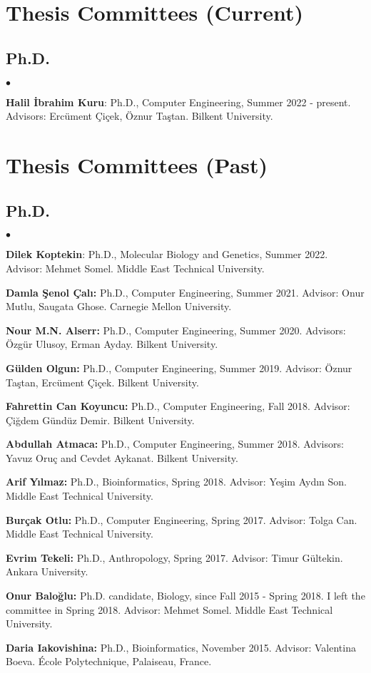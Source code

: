 \documentclass[margin,line]{res}
\newenvironment{list2}{
  \begin{list}{$\bullet$}{%
      \setlength{\itemsep}{0.1cm}
      \setlength{\parsep}{0in} \setlength{\parskip}{0in}
      \setlength{\topsep}{0in} \setlength{\partopsep}{0in} 
      \setlength{\leftmargin}{0.2in}}}{\end{list}}
\begin{document}
\begin{resume}
\section{\sc Thesis Committees (Current)}

\vspace*{-.4cm}
\subsection{\small \sc Ph.D.}
\begin{list2}
\item
{\bf Halil İbrahim Kuru}: Ph.D., Computer Engineering, Summer 2022 - present.
  Advisors: Ercüment Çiçek, Öznur Taştan.
  Bilkent University.
\end{list2}

\section{\sc Thesis Committees (Past)}

\vspace*{-.4cm}
\subsection{\small \sc Ph.D.}
\begin{list2}
\item
{\bf Dilek Koptekin}: Ph.D., Molecular Biology and Genetics, Summer 2022.
Advisor: Mehmet Somel. Middle East Technical University.
\item 
{\bf Damla Şenol Çalı:} Ph.D., Computer Engineering, Summer 2021. Advisor: Onur Mutlu, Saugata Ghose. Carnegie Mellon University.
\item 
{\bf  Nour M.N. Alserr:} Ph.D., Computer Engineering, Summer 2020.
  Advisors: Özgür Ulusoy, Erman Ayday.
  Bilkent University.
\item
  {\bf Gülden Olgun:} Ph.D., Computer Engineering, Summer 2019.
  Advisor: Öznur Taştan, Ercüment Çiçek.
  Bilkent University.
\item
  {\bf Fahrettin Can Koyuncu:} Ph.D., Computer Engineering, Fall 2018.
  Advisor: Çiğdem Gündüz Demir.
  Bilkent University.
\item
  {\bf Abdullah Atmaca:} Ph.D., Computer Engineering, Summer 2018.
  Advisors: Yavuz Oruç and Cevdet Aykanat.
  Bilkent University.
\item
  {\bf Arif Yılmaz:} Ph.D., Bioinformatics, Spring 2018.
  Advisor: Yeşim Aydın Son.
  Middle East Technical University.
\item 
  {\bf Burçak Otlu:} Ph.D., Computer Engineering, Spring 2017.
  Advisor: Tolga Can.
  Middle East Technical University. 
\item 
  {\bf Evrim Tekeli:} Ph.D., Anthropology,  Spring 2017.
  Advisor: Timur G\"{u}ltekin.
  Ankara University. 
\item
  {\bf Onur Baloğlu:} Ph.D. candidate, Biology, since Fall 2015 - Spring 2018. I left the committee in Spring 2018.
  Advisor: Mehmet Somel.
  Middle East Technical University.
\item
  {\bf Daria Iakovishina:} Ph.D., Bioinformatics,  November 2015.
  Advisor:  Valentina Boeva.
  École Polytechnique, Palaiseau, France.


\end{list2}
\end{resume}
\end{document}
